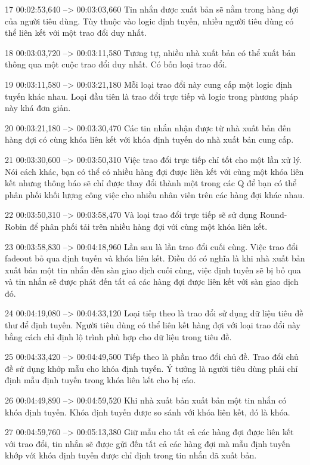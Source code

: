17
00:02:53,640 --> 00:03:03,660
Tin nhắn được xuất bản sẽ nằm trong hàng đợi của người tiêu dùng.  Tùy thuộc vào logic định tuyến, nhiều người tiêu dùng có thể liên kết với một trao đổi duy nhất.

18
00:03:03,720 --> 00:03:11,580
Tương tự, nhiều nhà xuất bản có thể xuất bản thông qua một cuộc trao đổi duy nhất.  Có bốn loại trao đổi.

19
00:03:11,580 --> 00:03:21,180
Mỗi loại trao đổi này cung cấp một logic định tuyến khác nhau.  Loại đầu tiên là trao đổi trực tiếp và logic trong phương pháp này khá đơn giản.

20
00:03:21,180 --> 00:03:30,470
Các tin nhắn nhận được từ nhà xuất bản đến hàng đợi có cùng khóa liên kết với khóa định tuyến do nhà xuất bản cung cấp.

21
00:03:30,600 --> 00:03:50,310
Việc trao đổi trực tiếp chỉ tốt cho một lần xử lý.  Nói cách khác, bạn có thể có nhiều hàng đợi được liên kết với cùng một khóa liên kết nhưng thông báo sẽ chỉ được thay đổi thành một trong các Q để bạn có thể phân phối khối lượng công việc cho nhiều nhân viên trên các hàng đợi khác nhau.

22
00:03:50,310 --> 00:03:58,470
Và loại trao đổi trực tiếp sẽ sử dụng Round-Robin để phân phối tải trên nhiều hàng đợi với cùng một khóa liên kết.

23
00:03:58,830 --> 00:04:18,960
Lần sau là lần trao đổi cuối cùng.  Việc trao đổi fadeout bỏ qua định tuyến và khóa liên kết.  Điều đó có nghĩa là khi nhà xuất bản xuất bản một tin nhắn đến sàn giao dịch cuối cùng, việc định tuyến sẽ bị bỏ qua và tin nhắn sẽ được phát đến tất cả các hàng đợi được liên kết với sàn giao dịch đó.

24
00:04:19,080 --> 00:04:33,120
Loại tiếp theo là trao đổi sử dụng dữ liệu tiêu đề thư để định tuyến.  Người tiêu dùng có thể liên kết hàng đợi với loại trao đổi này bằng cách chỉ định lộ trình phù hợp cho dữ liệu trong tiêu đề.

25
00:04:33,420 --> 00:04:49,500
Tiếp theo là phần trao đổi chủ đề.  Trao đổi chủ đề sử dụng khớp mẫu cho khóa định tuyến.  Ý tưởng là người tiêu dùng phải chỉ định mẫu định tuyến trong khóa liên kết cho bị cáo.

26
00:04:49,890 --> 00:04:59,520
Khi nhà xuất bản xuất bản một tin nhắn có khóa định tuyến.  Khóa định tuyến được so sánh với khóa liên kết, đó là khóa.

27
00:04:59,760 --> 00:05:13,380
Giữ mẫu cho tất cả các hàng đợi được liên kết với trao đổi, tin nhắn sẽ được gửi đến tất cả các hàng đợi mà mẫu định tuyến khớp với khóa định tuyến được chỉ định trong tin nhắn đã xuất bản.

